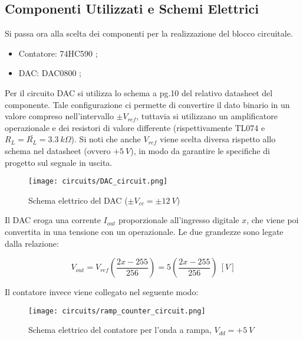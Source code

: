 \subsection*{Componenti Utilizzati e Schemi Elettrici}


Si passa ora alla scelta dei componenti per la realizzazione del blocco circuitale.

\begin{itemize}
    \item Contatore: 74HC590 \cite{74hc590};
    \item DAC: DAC0800 \cite{dac0800};
\end{itemize}

Per il circuito DAC si utilizza lo schema a pg.10 del relativo datasheet del componente.
Tale configurazione ci permette di convertire il dato binario in un valore compreso
nell'intervallo $\pm V_{ref}$, tuttavia si utilizzano un amplificatore operazionale e dei
resistori di valore differente (rispettivamente TL074 \cite{tl074} e $R_L=\bar{R_L}=3.3\ k\Omega$).
Si noti che anche $V_{ref}$ viene scelta diversa rispetto allo schema nel datasheet
(ovvero $+5\ V$), in modo da garantire le specifiche di progetto sul segnale in uscita.

\begin{figure}[H]
    \centering
    \texttt{[image: circuits/DAC\_circuit.png]}
    \caption{Schema elettrico del DAC ($\pm V_{cc}=\pm 12\ V$)}
    \label{DAC_circuit}
\end{figure}

Il DAC eroga una corrente $I_{out}$ proporzionale all'ingresso digitale $x$, che viene poi
convertita in una tensione con un operazionale. Le due grandezze sono legate dalla relazione:

\begin{equation}\label{vout_dac}
    V_{out}=V_{ref}\left(\frac{2x-255}{256}\right)=5\left(\frac{2x-255}{256}\right)\ [V]
\end{equation}

Il contatore invece viene collegato nel seguente modo:

\begin{figure}[H]
    \centering
    \texttt{[image: circuits/ramp\_counter\_circuit.png]}
    \caption{Schema elettrico del contatore per l'onda a rampa, $V_{dd}=+5\ V$}
    \label{ramp_counter_circuit}
\end{figure}


